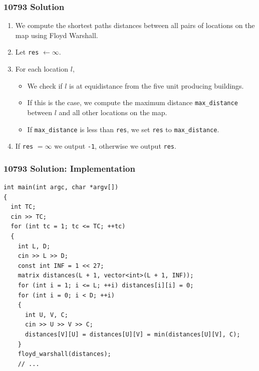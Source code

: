 \documentclass{beamer}
\begin{document}
\ifanswers

\begin{frame}%
\frametitle{10793 Solution}

\begin{enumerate}

\item We compute the shortest paths distances between all pairs of locations on the map using Floyd Warshall.

\item<2-> Let \texttt{res} $\leftarrow \infty$.

\item<3-> For each location $l$,

\begin{itemize}

\item<3-> We check if $l$ is at equidistance from the five unit producing buildings.

\item<4-> If this is the case, we compute the maximum distance \texttt{max\_distance} between $l$ and all other locations on the map.

\item<5-> If \texttt{max\_distance} is less than \texttt{res}, we set \texttt{res} to \texttt{max\_distance}.

\end{itemize}

\item<6-> If \texttt{res} $= \infty$ we output \texttt{-1}, otherwise we output \texttt{res}.

\end{enumerate}


\end{frame}


\begin{frame}[containsverbatim]
\frametitle{10793 Solution: Implementation}

\scriptsize
\begin{lstlisting}
int main(int argc, char *argv[])
{
  int TC;
  cin >> TC;
  for (int tc = 1; tc <= TC; ++tc)
  {
    int L, D;
    cin >> L >> D;
    const int INF = 1 << 27;
    matrix distances(L + 1, vector<int>(L + 1, INF));
    for (int i = 1; i <= L; ++i) distances[i][i] = 0;
    for (int i = 0; i < D; ++i)
    {
      int U, V, C;
      cin >> U >> V >> C;
      distances[V][U] = distances[U][V] = min(distances[U][V], C);
    }
    floyd_warshall(distances);
    // ...
\end{lstlisting}

\end{frame}
\end{document}

